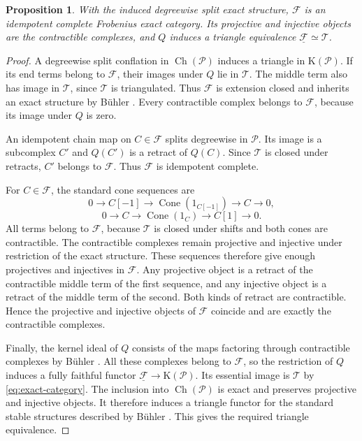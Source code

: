\documentclass[11pt,a4paper,reqno]{amsart}
\newcommand{\Pcal}{\mathcal P}
\newcommand{\Tcal}{\mathcal T}
\newcommand{\Cone}{\operatorname{Cone}}
\theoremstyle{plain}
\newtheorem{proposition}[theorem]{Proposition}
\theoremstyle{definition}
\theoremstyle{remark}
\newcommand{\Fcal}{\mathcal F}
\newcommand{\Ch}{\operatorname{Ch}}
\newcommand{\Kcat}{\mathrm K}
\begin{document}
\begin{proposition}\label{prop:model}
With the induced degreewise split exact structure, $\Fcal$ is an idempotent complete Frobenius exact category. Its projective and injective objects are the contractible complexes, and $Q$ induces a triangle equivalence $\underline{\Fcal}\simeq\Tcal$.
\end{proposition}

\begin{proof}
A degreewise split conflation in $\Ch(\Pcal)$ induces a triangle in $\Kcat(\Pcal)$. If its end terms belong to $\Fcal$, their images under $Q$ lie in $\Tcal$. The middle term also has image in $\Tcal$, since $\Tcal$ is triangulated. Thus $\Fcal$ is extension closed and inherits an exact structure by B\"uhler \cite[Lemma~10.20]{Buh10}. Every contractible complex belongs to $\Fcal$, because its image under $Q$ is zero.

An idempotent chain map on $C\in\Fcal$ splits degreewise in $\Pcal$. Its image is a subcomplex $C'$ and $Q(C')$ is a retract of $Q(C)$. Since $\Tcal$ is closed under retracts, $C'$ belongs to $\Fcal$. Thus $\Fcal$ is idempotent complete.

For $C\in\Fcal$, the standard cone sequences are
$$
0\longrightarrow C[-1]\longrightarrow\Cone(1_{C[-1]})\longrightarrow C\longrightarrow0,
$$
$$
0\longrightarrow C\longrightarrow\Cone(1_C)\longrightarrow C[1]\longrightarrow0.
$$
All terms belong to $\Fcal$, because $\Tcal$ is closed under shifts and both cones are contractible. The contractible complexes remain projective and injective under restriction of the exact structure. These sequences therefore give enough projectives and injectives in $\Fcal$. Any projective object is a retract of the contractible middle term of the first sequence, and any injective object is a retract of the middle term of the second. Both kinds of retract are contractible. Hence the projective and injective objects of $\Fcal$ coincide and are exactly the contractible complexes.

Finally, the kernel ideal of $Q$ consists of the maps factoring through contractible complexes by B\"uhler \cite[Remark~9.11]{Buh10}. All these complexes belong to $\Fcal$, so the restriction of $Q$ induces a fully faithful functor $\underline{\Fcal}\to\Kcat(\Pcal)$. Its essential image is $\Tcal$ by \eqref{eq:exact-category}. The inclusion into $\Ch(\Pcal)$ is exact and preserves projective and injective objects. It therefore induces a triangle functor for the standard stable structures described by B\"uhler \cite[Theorem~13.7 and Example~13.8]{Buh10}. This gives the required triangle equivalence.
\end{proof}
\end{document}

